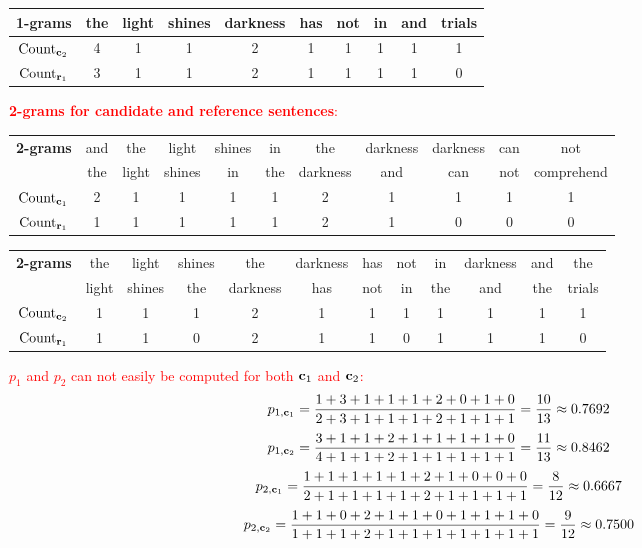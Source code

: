 \begin{parts}
\begin{subparts}
\begin{table}[h!]
\centering
{\color{red}\begin{tabular}{|c|c|c|c|c|c|c|c|c|c|} 
 \hline
 \textbf{1-grams} & the & light & shines & darkness & has & not & in & and & trials \\ [0.5ex] 
 \hline
 $\text{Count}_{\mathbf{c}_2}$ & 4 & 1 & 1 & 2 & 1 & 1 & 1 & 1 & 1\\ 
 $\text{Count}_{\mathbf{r}_1}$ & 3 & 1 & 1 & 2 & 1 & 1 & 1 & 1 & 0 \\ [1ex] 
 \hline
\end{tabular}}
\label{table:1}
\end{table}

\textcolor{red}{\textbf{2-grams for candidate and reference sentences}:}

\begin{table}[h!]
\centering
{\color{red}\begin{tabular}{|c|c|c|c|c|c|c|c|c|c|c|} 
 \hline
 \multirow{2}{*}{\textbf{2-grams}} & and & the & light & shines & in & the & darkness & darkness & can & not \\
 & the & light & shines & in & the & darkness & and & can & not & comprehend\\ [0.5ex] 
 \hline
 $\text{Count}_{\mathbf{c}_1}$ & 2 & 1 & 1 & 1 & 1 & 2 & 1 & 1 & 1 & 1\\  
 $\text{Count}_{\mathbf{r}_1}$ & 1 & 1 & 1 & 1 & 1 & 2 & 1 & 0 & 0 & 0\\ [1ex] 
 \hline
\end{tabular}}
\label{table:1}
\end{table}

\begin{table}[h!]
\centering
{\color{red}\begin{tabular}{|c|c|c|c|c|c|c|c|c|c|c|c|} 
 \hline
 \multirow{2}{*}{\textbf{2-grams}} & the & light & shines & the & darkness & has & not & in & darkness & and & the\\
& light & shines & the & darkness & has & not & in & the & and & the & trials\\ [0.5ex] 
 \hline
 $\text{Count}_{\mathbf{c}_2}$ & 1 & 1 & 1 & 2 & 1 & 1 & 1 & 1 & 1 & 1 & 1\\  
 $\text{Count}_{\mathbf{r}_1}$ & 1 & 1 & 0 & 2 & 1 & 1 & 0 & 1 & 1 & 1 & 0\\ [1ex] 
 \hline
\end{tabular}}
\label{table:1}
\end{table}

\textcolor{red}{$p_1$ and $p_2$ can not easily be computed for both $\mathbf{c}_1$ and $\mathbf{c}_2$:
\[
p_{1,\mathbf{c}_1} = \frac{1+3+1+1+1+2+0+1+0}{2 + 3 + 1 + 1 + 1 + 2 + 1 + 1 + 1} = \frac{10}{13} \approx 0.7692
\]
\[
p_{1,\mathbf{c}_2} = \frac{3+1+1+2+1+1+1+1+0}{4 + 1 + 1 + 2 + 1 + 1 + 1 + 1 + 1} = \frac{11}{13} \approx 0.8462
\]
\[
p_{2,\mathbf{c}_1} = \frac{1+1+1+1+1+2+1+0+0+0}{2 + 1 + 1 + 1 + 1 + 2 + 1 + 1 + 1 + 1} = \frac{8}{12} \approx 0.6667
\]
\[
p_{2,\mathbf{c}_2} = \frac{1+1+0+2+1+1+0+1+1+1+0}{1 + 1 + 1 + 2 + 1 + 1 + 1 + 1 + 1 + 1 + 1} = \frac{9}{12} \approx 0.7500
\]}


\end{subparts}
\end{parts}
